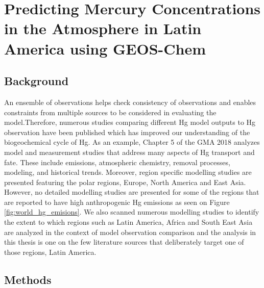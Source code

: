 \chapter{Predicting Mercury Concentrations in the Atmosphere in Latin America using GEOS-Chem }
\section{Background}


\begin{flushleft}
An ensemble of observations helps check consistency of observations and enables constraints from multiple sources to be considered in evaluating the model\cite{brasseur_modeling_2017}.Therefore, numerous studies comparing different Hg model outputs to Hg observation have been published which has improved our understanding of the biogeochemical cycle of Hg. As an example, Chapter 5 of the GMA 2018 analyzes model and measurement studies that address many aspects of Hg transport and fate. These include emissions, atmospheric chemistry, removal processes, modeling, and historical trends. Moreover, region specific modelling studies are presented featuring the polar regions, Europe, North America and East Asia. However, no detailed modelling studies are presented for some of the regions that are reported to have high anthropogenic Hg emissions as seen on Figure \ref{fig:world_hg_emisions}. We also scanned numerous modelling studies to identify the extent to which regions such as Latin America, Africa and South East Asia are analyzed in the context of model observation comparison and the analysis in this thesis is one on the few literature sources that deliberately target one of those regions, Latin America. 
\end{flushleft}








\section{Methods}
